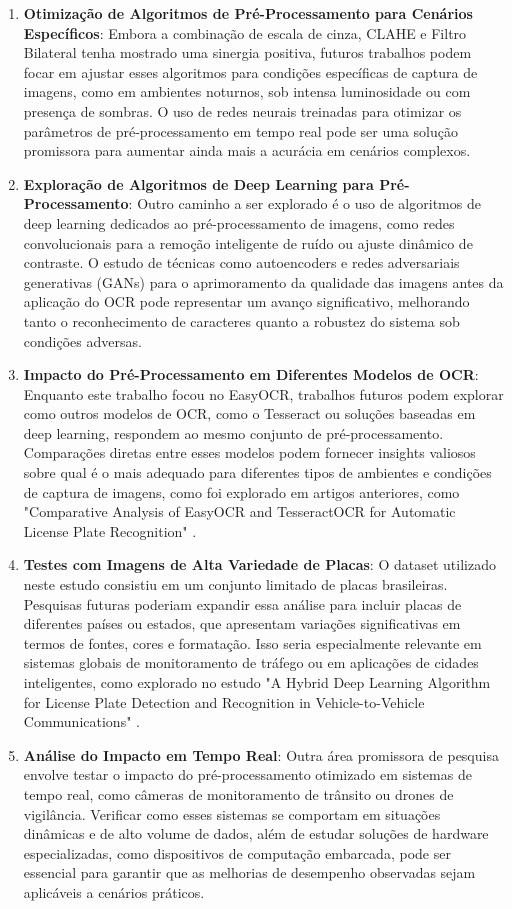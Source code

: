 \documentclass[conference]{IEEEtran}
\begin{document}
\begin{enumerate}
    \item \textbf{Otimização de Algoritmos de Pré-Processamento para Cenários Específicos}: Embora a combinação de escala de cinza, CLAHE e Filtro Bilateral tenha mostrado uma sinergia positiva, futuros trabalhos podem focar em ajustar esses algoritmos para condições específicas de captura de imagens, como em ambientes noturnos, sob intensa luminosidade ou com presença de sombras. O uso de redes neurais treinadas para otimizar os parâmetros de pré-processamento em tempo real pode ser uma solução promissora para aumentar ainda mais a acurácia em cenários complexos.
    \item \textbf{Exploração de Algoritmos de Deep Learning para Pré-Processamento}: Outro caminho a ser explorado é o uso de algoritmos de deep learning dedicados ao pré-processamento de imagens, como redes convolucionais para a remoção inteligente de ruído ou ajuste dinâmico de contraste. O estudo de técnicas como autoencoders e redes adversariais generativas (GANs) para o aprimoramento da qualidade das imagens antes da aplicação do OCR pode representar um avanço significativo, melhorando tanto o reconhecimento de caracteres quanto a robustez do sistema sob condições adversas.
    \item \textbf{Impacto do Pré-Processamento em Diferentes Modelos de OCR}: Enquanto este trabalho focou no EasyOCR, trabalhos futuros podem explorar como outros modelos de OCR, como o Tesseract ou soluções baseadas em deep learning, respondem ao mesmo conjunto de pré-processamento. Comparações diretas entre esses modelos podem fornecer insights valiosos sobre qual é o mais adequado para diferentes tipos de ambientes e condições de captura de imagens, como foi explorado em artigos anteriores, como "Comparative Analysis of EasyOCR and TesseractOCR for Automatic License Plate Recognition" \cite{b1}.
	\item \textbf{Testes com Imagens de Alta Variedade de Placas}: O dataset utilizado neste estudo consistiu em um conjunto limitado de placas brasileiras. Pesquisas futuras poderiam expandir essa análise para incluir placas de diferentes países ou estados, que apresentam variações significativas em termos de fontes, cores e formatação. Isso seria especialmente relevante em sistemas globais de monitoramento de tráfego ou em aplicações de cidades inteligentes, como explorado no estudo "A Hybrid Deep Learning Algorithm for License Plate Detection and Recognition in Vehicle-to-Vehicle Communications" \cite{b7}.
	\item \textbf{Análise do Impacto em Tempo Real}: Outra área promissora de pesquisa envolve testar o impacto do pré-processamento otimizado em sistemas de tempo real, como câmeras de monitoramento de trânsito ou drones de vigilância. Verificar como esses sistemas se comportam em situações dinâmicas e de alto volume de dados, além de estudar soluções de hardware especializadas, como dispositivos de computação embarcada, pode ser essencial para garantir que as melhorias de desempenho observadas sejam aplicáveis a cenários práticos.

\end{enumerate}
\end{document}
